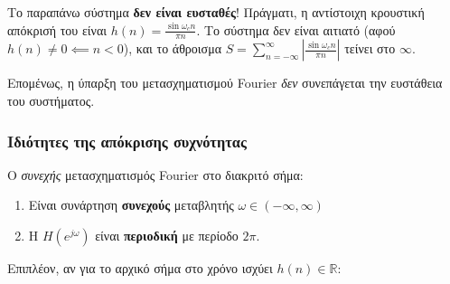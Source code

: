 \documentclass[11pt,a4paper,notitlepage,fleqn]{article}
\begin{document}
Το παραπάνω σύστημα \textbf{δεν είναι ευσταθές}! Πράγματι, η αντίστοιχη κρουστική απόκρισή του είναι
\( h(n) = \frac{\sin\omega_c n}{\pi n} \). Το σύστημα δεν είναι αιτιατό (αφού \( h(n)\neq 0 \impliedby n <0 \)), και το άθροισμα \( \displaystyle S = \sum_{n=-\infty}^{\infty} \left| \frac{\sin\omega_c n}{\pi n} \right| \) τείνει στο \( \infty \).

Επομένως, η ύπαρξη του μετασχηματισμού Fourier \emph{δεν} συνεπάγεται την ευστάθεια του συστήματος.

\subsubsection{Ιδιότητες της απόκρισης συχνότητας}
Ο \emph{συνεχής} μετασχηματισμός Fourier στο διακριτό σήμα:
\begin{enumerate}
	\item Είναι συνάρτηση \textbf{συνεχούς} μεταβλητής \( \omega \in (-\infty,\infty) \)
	\item Η \( H\left( e^{j\omega } \right) \) είναι \textbf{περιοδική} με περίοδο \( 2π \).
\end{enumerate}

Επιπλέον, αν για το αρχικό σήμα στο χρόνο ισχύει \( h(n)\in\mathbb R \):
\end{document}
